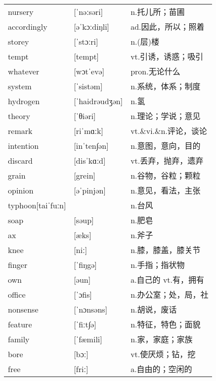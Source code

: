\documentclass[a4paper]{article}
\begin{document}
\section{}
\begin{tabular}{l l l}

nursery & [ˈnəːsəri] & n.托儿所；苗圃 \\
accordingly & [əˈkɔːdiŋli] & ad.因此，所以；照着 \\
storey & [ˈstɔːri] & n.(层)楼 \\
tempt & [tempt] & vt.引诱，诱惑；吸引 \\
whatever & [wɔtˈevə] & pron.无论什么 \\
system & [ˈsistəm] & n.系统，体系；制度 \\
hydrogen & [ˈhaidrəudʒən] & n.氢 \\
theory & [ˈθiəri] & n.理论；学说；意见 \\
remark & [riˈmɑːk] & vt.\&vi.\&n.评论，谈论 \\
intention & [inˈten∫ən] & n.意图，意向，目的 \\
discard & [disˈkɑːd] & vt.丢弃，抛弃，遗弃 \\
grain & [grein] & n.谷物，谷粒；颗粒 \\
opinion & [əˈpinjən] & n.意见，看法，主张 \\
typhoon[taiˈfuːn] &  & n.台风 \\
soap & [səup] & n.肥皂 \\
ax & [æks] & n.斧子 \\
knee & [niː] & n.膝，膝盖，膝关节 \\
finger & [ˈfiŋgə] & n.手指；指状物 \\
own & [əun] & a.自己的 vt.有，拥有 \\
office & [ˈɔfis] & n.办公室；处，局，社 \\
nonsense & [ˈnɔnsəns] & n.胡说，废话 \\
feature & [ˈfiːt∫ə] & n.特征，特色；面貌 \\
family & [ˈfæmili] & n.家，家庭；家族 \\
bore & [bɔː] & vt.使厌烦；钻，挖 \\
free & [friː] & a.自由的；空闲的 \\

\end{tabular}
\end{document}
